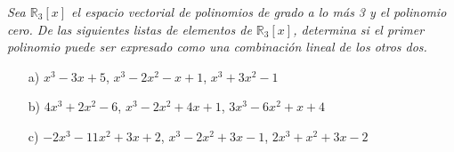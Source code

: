 \documentclass[11pt,letterpaper]{article}
\newcommand{\R}{\mathbb{R}}
\begin{document}
\begin{tcolorbox}[title=Problema 3, colframe=G, coltitle=B, fonttitle=\bfseries]
    \textit{Sea $\R_3[x]$ el espacio vectorial de polinomios de grado a lo más 3 y el polinomio cero.  
    De las siguientes listas de elementos de $\R_3[x]$, determina si el primer polinomio 
    puede ser expresado como una combinación lineal de los otros dos.}
    \begin{itemize}
        \item[a)] $x^3 - 3x + 5$, $x^3 - 2x^2 - x + 1$, $x^3 + 3x^2 - 1$
        \item[b)] $4x^3 + 2x^2 - 6$, $x^3 - 2x^2 + 4x + 1$, $3x^3 - 6x^2 + x + 4$
        \item[c)] $-2x^3 - 11x^2 + 3x + 2$, $x^3 - 2x^2 + 3x - 1$, $2x^3 + x^2 + 3x - 2$
    \end{itemize}
\end{tcolorbox}
\end{document}
